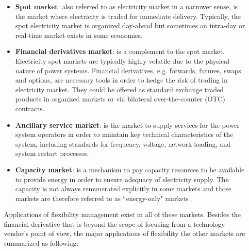 \begin{itemize}
	\item \textbf{Spot market}: also referred to as electricity market in a narrower sense, is the market where electricity is traded for immediate delivery. Typically, the spot electricity market is organized day-ahead but sometimes an intra-day or real-time market exists in some economies.
	\item \textbf{Financial derivatives market}: is a complement to the spot market. Electricity spot markets are typically highly volatile due to the physical nature of power systems. Financial derivatives, e.g. forwards, futures, swaps and options, are necessary tools in order to hedge the risk of trading in electricity market. They could be offered as standard exchange traded products in organized markets or via bilateral over-the-counter (OTC) contracts.
	\item \textbf{Ancillary service market}: is the market to supply services for the power system operators in order to maintain key technical characteristics of the system, including standards for frequency, voltage, network loading, and system restart processes.
	\item \textbf{Capacity market}: is a mechanism to pay capacity resources to be available to provide energy in order to ensure adequacy of electricity supply. The capacity is not always remunerated explicitly in some markets and those markets are therefore referred to as ``energy-only" markets \cite{Brown2015}.
\end{itemize}

Applications of flexibility management exist in all of these markets. Besides the financial derivative that is beyond the scope of focusing from a technology vendor's point of view, the major applications of flexibility the other markets are summarized as following:

